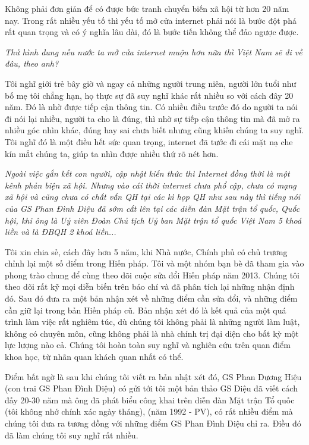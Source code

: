 Không phải đơn giản để có được bức tranh chuyển biến xã hội từ hơn 20 năm nay. Trong rất nhiều yếu tố thì yếu tố mở cửa internet phải nói là bước đột phá rất quan trọng và có ý nghĩa lâu dài, đó là bước tiến không thể đảo ngược được.

\emph{
Thử hình dung nếu nước ta mở cửa internet muộn hơn nữa thì Việt Nam sẽ đi về đâu, theo anh?}

Tôi nghĩ giới trẻ bây giờ và ngay cả những người trung niên, người lớn tuổi như bố mẹ tôi chẳng hạn, họ thực sự đã suy nghĩ khác rất nhiều so với cách đây 20 năm. Đó là nhờ được tiếp cận thông tin. Có nhiều điều trước đó do người ta nói đi nói lại nhiều, người ta cho là đúng, thì nhờ sự tiếp cận thông tin mà đã mở ra nhiều góc nhìn khác, đúng hay sai chưa biết nhưng cũng khiến chúng ta suy nghĩ. Tôi nghĩ đó là một điều hết sức quan trọng, internet đã tước đi cái mặt nạ che kín mắt chúng ta, giúp ta nhìn được nhiều thứ rõ nét hơn.

\emph{
Ngoài việc gắn kết con người, cập nhật kiến thức thì Internet đồng thời là một kênh phản biện xã hội. Nhưng vào cái thời internet chưa phổ cập, chưa có mạng xã hội và cũng chưa có chất vấn QH tại các kì họp QH như sau này thì tiếng nói của GS Phan Đình Diệu đã sớm cất lên tại các diễn đàn Mặt trận tổ quốc, Quốc hội, khi ông là Uỷ viên Đoàn Chủ tịch Uỷ ban Mặt trận tổ quốc Việt Nam 5 khoá liền và là ĐBQH 2 khoá liền...}

Tôi xin chia sẻ, cách đây hơn 5 năm, khi Nhà nước, Chính phủ có chủ trương chỉnh lại một số điểm trong Hiến pháp. Tôi và một nhóm bạn bè đã tham gia vào phong trào chung để cùng theo dõi cuộc sửa đổi Hiến pháp năm 2013. Chúng tôi theo dõi rất kỹ mọi diễn biến trên báo chí và đã phân tích lại những nhận định đó. Sau đó đưa ra một bản nhận xét về những điểm cần sửa đổi, và những điểm cần giữ lại trong bản Hiến pháp cũ. Bản nhận xét đó là kết quả của một quá trình làm việc rất nghiêm túc, dù chúng tôi không phải là những người làm luật, không có chuyên môn, cũng không phải là nhà chính trị đại diện cho bất kỳ một lực lượng nào cả. Chúng tôi hoàn toàn suy nghĩ và nghiên cứu trên quan điểm khoa học, từ nhãn quan khách quan nhất có thể. 

Điểm bất ngờ là sau khi chúng tôi viết ra bản nhật xét đó, GS Phan Dương Hiệu (con trai GS Phan Đình Diệu) có gửi tới tôi một bản thảo GS Diệu đã viết cách đấy 20-30 năm mà ông đã phát biểu công khai trên diễn đàn Mặt trận Tổ quốc (tôi không nhớ chính xác ngày tháng), (năm 1992 - PV), có rất nhiều điểm mà chúng tôi đưa ra tương đồng với những điểm GS Phan Đình Diệu chỉ ra. Điều đó đã làm chúng tôi suy nghĩ rất nhiều. 

